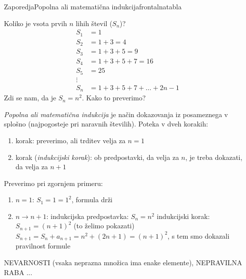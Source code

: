 \begin{priprava}{}{}{Zaporedja}{Popolna ali matematična indukcija}{frontalna}{tabla}

Koliko je vsota prvih $ n $ lihih števil ($ S_n $)?
\begin{equation*}
    \begin{split}
S_1 & = 1 \\
S_2 & = 1 + 3 = 4 \\
S_3 & = 1 + 3 + 5 = 9 \\
S_4 & = 1 + 3 + 5 + 7 = 16 \\
S_5 & = 25 \\
\vdots \\
S_n & = 1 + 3 + 5 + 7 + \ldots + 2n - 1
    \end{split}
\end{equation*}
Zdi se nam, da je $ S_n = n^2 $. Kako to preverimo?

\emph{Popolna ali matematična indukcija} je način dokazovanja iz posameznega v splošno (najpogosteje pri naravnih številih). Poteka v dveh korakih:
\begin{enumerate}
    \item korak: preverimo, ali trditev velja za $ n = 1 $
    \item korak (\emph{indukcijski korak}): ob predpostavki, da velja za $ n $, je treba dokazati, da velja za $ n + 1 $
\end{enumerate}

Preverimo pri zgornjem primeru:
\begin{enumerate}
    \item $ n = 1 $: $ S_1 = 1 = 1^2 $, formula drži
    \item $ n \rightarrow n + 1 $:
        \subitem indukcijska predpostavka: $ S_n = n^2 $
        \subitem indukcijski korak: $ S_{n+1} = (n+1)^2 $ (to želimo pokazati)
        \subitem $ S_{n+1} = S_n + a_{n+1} = n^2 + (2n + 1) = (n + 1)^2 $, s tem smo dokazali pravilnost formule
\end{enumerate}


NEVARNOSTI (vsaka neprazna množica ima enake elemente), NEPRAVILNA RABA ...

\end{priprava}